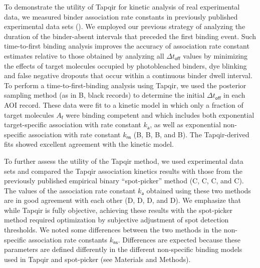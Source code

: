 To demonstrate the utility of Tapqir for kinetic analysis of real experimental data, we measured binder association rate constants in previously published experimental data sets ().  We employed our previous strategy  \citep{Friedman2012-if,Friedman2015-nx} of analyzing the duration of the binder-absent intervals that preceded the first binding event.  Such time-to-first binding analysis improves the accuracy of association rate constant estimates relative to those obtained by analyzing all $\Delta t_\mathsf{off}$ values by minimizing the effects of target molecules occupied by photobleached binders, dye blinking and false negative dropouts that occur within a continuous binder dwell interval.  To perform a time-to-first-binding analysis using Tapqir, we used the posterior sampling method (as in B, black records) to determine the initial $\Delta t_\mathsf{off}$ in each AOI record. These data were fit to a kinetic model \citep{Friedman2012-if,Friedman2015-nx} in which only a fraction of target molecules $A_\mathsf{f}$ were binding competent and which includes both exponential target-specific association with rate constant $k_\mathsf{a}$, as well as exponential non-specific association with rate constant $k_\mathsf{ns}$ (B, B, B, and B).  The Tapqir-derived fits showed excellent agreement with the kinetic model.  

To further assess the utility of the Tapqir method, we used experimental data sets and compared the Tapqir association kinetics results with those from the previously published empirical binary ``spot-picker'' method \citep{Friedman2015-nx} (C, C, C, and C). The values of the association rate constant $k_\mathsf{a}$ obtained using these two methods are in good agreement with each other (D, D, D, and D). We emphasize that while Tapqir is fully objective, achieving these results with the spot-picker method required optimization by subjective adjustment of spot detection thresholds.  We noted some differences between the two methods in the non-specific association rate constants $k_\mathsf{ns}$. Differences are expected because these parameters are defined differently in the different non-specific binding models used in Tapqir and  spot-picker (see Materials and Methods).



